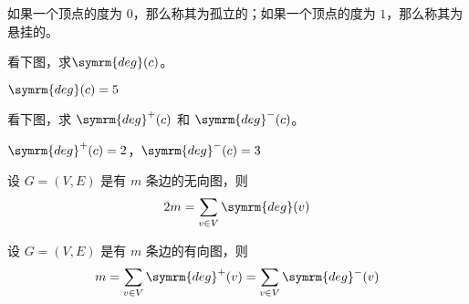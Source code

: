如果一个顶点的度为 $0$，那么称其为孤立的；如果一个顶点的度为 $1$，那么称其为悬挂的。
\begin{collections}
    \begin{example}
        看下图，求$\symrm{deg}(c)$。
            \begin{center}
            \end{center}
    \end{example}
    \begin{solution}
        $\symrm{deg}(c)=5$
    \end{solution}
    \spare
    \begin{example}
        看下图，求 $\symrm{deg}^+(c)$ 和 $\symrm{deg}^-(c)$。
            \begin{center}
            \end{center}
    \end{example}
    \begin{solution}
        $\symrm{deg}^+(c)=2$，$\symrm{deg}^-(c)=3$
    \end{solution}
\end{collections}

\begin{theorem}[无向图的握手定理]\label{thm:无向图的握手定理}
    设 $G=(V,E)$ 是有 $m$ 条边的无向图，则
    \begin{equation*}
        2m = \sum_{v \in V} \symrm{deg}(v)
    \end{equation*}
\end{theorem}
\begin{theorem}[有向图的握手定理]\label{thm:有向图的握手定理}
    设 $G=(V,E)$ 是有 $m$ 条边的有向图，则
    \begin{equation*}
        m = \sum_{v \in V} \symrm{deg}^+(v) = \sum_{v \in V} \symrm{deg}^-(v)
    \end{equation*}
\end{theorem}

